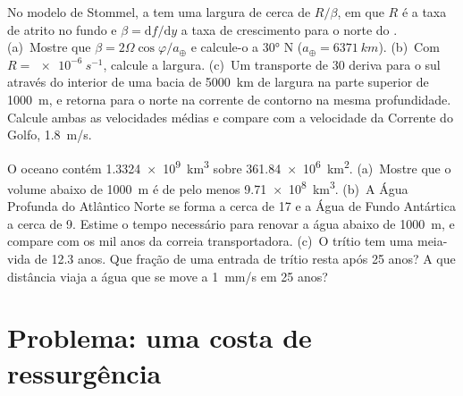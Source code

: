 \begin{exercise}[$\star\star\star$]\label{exo:b1:ocean-circulation:11}
No modelo de Stommel, a  tem uma largura de cerca de $R/\beta$,
em que $R$ é a taxa de atrito no fundo e $\beta = \mathrm df/\mathrm dy$ a
taxa de crescimento para o norte do . (a)~Mostre que $\beta = 2\Omega
\cos\varphi/a_\oplus$ e calcule-o a \ang{30} N ($a_\oplus = \qty{6371}{km}$).
(b)~Com $R = \qty{e-6}{s^{-1}}$, calcule a largura. (c)~Um transporte de
\qty{30}{\sverdrup} deriva para o sul através do interior de uma bacia de \qty{5000}{km} de largura
na parte superior de \qty{1000}{m}, e retorna para o norte na corrente de contorno na mesma
profundidade. Calcule ambas as velocidades médias e compare com a velocidade da Corrente do Golfo,
\qty{1.8}{m/s}.
\end{exercise}

\begin{exercise}[$\star\star\star$]\label{exo:b1:ocean-circulation:12}
O oceano contém \qty{1.3324e9}{km^3} sobre \qty{361.84e6}{km^2}. (a)~Mostre que o
volume abaixo de \qty{1000}{m} é de pelo menos \qty{9.71e8}{km^3}. (b)~A Água Profunda do
Atlântico Norte se forma a cerca de \qty{17}{\sverdrup} e a Água de Fundo Antártica a cerca de
\qty{9}{\sverdrup}. Estime o tempo necessário para renovar a água abaixo de
\qty{1000}{m}, e compare com os mil anos da correia transportadora. (c)~O trítio tem uma
meia-vida de 12.3 anos. Que fração de uma entrada de trítio resta após 25 anos? A que
distância viaja a água que se move a \qty{1}{mm/s} em 25 anos?
\end{exercise}

\section{Problema: uma costa de ressurgência}

